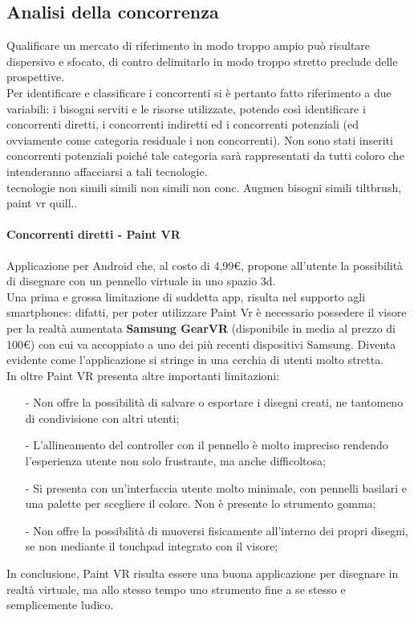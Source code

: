 \documentclass[11pt,fleqn]{book} %
\begin{document}
\subsection{Analisi della concorrenza}
Qualificare un mercato di riferimento in modo troppo ampio può risultare dispersivo e
sfocato, di contro delimitarlo in modo troppo stretto preclude delle prospettive. \\Per
identificare e classificare i concorrenti si è pertanto fatto riferimento a due variabili: i
bisogni serviti e le risorse utilizzate, potendo così identificare i concorrenti diretti, i
concorrenti indiretti ed i concorrenti potenziali (ed ovviamente come categoria residuale
i non concorrenti). Non sono stati inseriti concorrenti potenziali poiché tale categoria sarà
rappresentati da tutti coloro che intenderanno affacciarsi a tali tecnologie.\\
\newpage
						tecnologie
 			  	non simili		simili
	non simili	non conc.		Augmen								
bisogni
		simili	tiltbrush, 		paint vr
				quill.. 
				
\paragraph{Concorrenti diretti - Paint VR}
Applicazione per Android che, al costo di 4,99€, propone all'utente la possibilità di disegnare con un pennello virtuale in uno spazio 3d.\\
Una prima e grossa limitazione di suddetta app, risulta nel supporto agli smartphones: difatti, per poter utilizzare Paint Vr è necessario possedere il visore per la realtà aumentata \textbf{Samsung GearVR} (disponibile in media al prezzo di 100€) con cui va accoppiato a uno dei più recenti dispositivi Samsung. Diventa evidente come l'applicazione si stringe in una cerchia di utenti molto stretta.\\
In oltre Paint VR presenta altre importanti limitazioni: 
\begin{itemize}
\item[-] Non offre la possibilità di salvare o esportare i disegni creati, ne tantomeno di condivisione con altri utenti;
\item[-] L'allineamento del controller con il pennello è molto impreciso rendendo l'esperienza utente non solo frustrante, ma anche difficoltosa; 
\item[-] Si presenta con un'interfaccia utente molto minimale, con pennelli basilari e una palette per scegliere il colore. Non è presente lo strumento gomma;
\item[-] Non offre la possibilità di muoversi fisicamente all'interno dei propri disegni, se non mediante il touchpad integrato con il visore;
\end{itemize}
In conclusione, Paint VR risulta essere una buona applicazione per disegnare in realtà virtuale, ma allo stesso tempo uno strumento fine a se stesso e semplicemente ludico.
\end{document}
